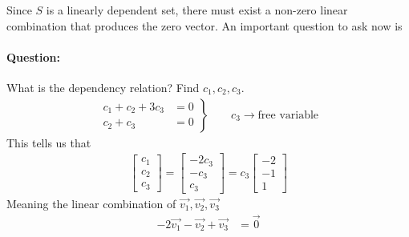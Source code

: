 \documentclass[11pt]{article}
\newcommand{\ques}{\paragraph{Question:}}
\newcommand{\vek}[1]{\vec{#1}}
\begin{document}
Since $S$ is a linearly dependent set, there must exist a non-zero linear combination that produces the zero vector. An important question to ask now is

\ques What is the dependency relation? Find $c_1, c_2, c_3$.
\begin{align*}
\left.
\begin{aligned}
c_1 + c_2 + 3 c_3 &= 0
\\
c_2 + c_3 &= 0
\end{aligned}
\right\} \qquad c_3 \rightarrow \text{free variable}
\end{align*}
This tells us that
\begin{align*}
\begin{bmatrix}c_1\\c_2\\c_3\end{bmatrix}
=
\begin{bmatrix}-2c_3 \\ -c_3 \\ c_3\end{bmatrix}
=
c_3 \begin{bmatrix}-2\\-1\\1\end{bmatrix}
\end{align*}
Meaning the linear combination of $\vek{v_1}, \vek{v_2}, \vek{v_3}$
\begin{align*}
-2 \vek{v_1} - \vek{v_2} + \vek{v_3} &= \vek{0}
\end{align*}
\end{document}
